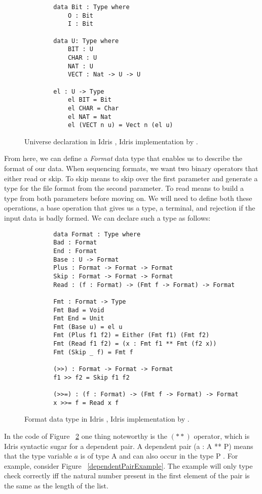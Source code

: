 \begin{figure}
    \caption{Universe declaration in Idris \cite{power_of_pi}, Idris implementation by \cite{idris_pop}.}
    \label{universe}
    \begin{lstlisting}
        data Bit : Type where
            O : Bit
            I : Bit

        data U: Type where
            BIT : U
            CHAR : U
            NAT : U
            VECT : Nat -> U -> U
        
        el : U -> Type
            el BIT = Bit
            el CHAR = Char
            el NAT = Nat
            el (VECT n u) = Vect n (el u) 
    \end{lstlisting}
\end{figure}

From here, we can define a \textit{Format} data type that enables us to describe
the format of our data. When sequencing formats, we want two binary operators
that either read or skip. To skip means to skip over the first parameter and
generate a type for the file format from the second parameter. To read means to
build a type from both parameters before moving on. We will need to define both
these operations, a base operation that gives us a type, a terminal, and
rejection if the input data is badly formed. We can declare such a type as
follows: 

\begin{figure}
    \caption{Format data type in Idris \cite{power_of_pi}, Idris implementation by \cite{idris_pop}.}
    \label{formatDeclaration}
    \begin{lstlisting}
        data Format : Type where
        Bad : Format
        End : Format
        Base : U -> Format
        Plus : Format -> Format -> Format
        Skip : Format -> Format -> Format
        Read : (f : Format) -> (Fmt f -> Format) -> Format

        Fmt : Format -> Type
        Fmt Bad = Void
        Fmt End = Unit
        Fmt (Base u) = el u
        Fmt (Plus f1 f2) = Either (Fmt f1) (Fmt f2)
        Fmt (Read f1 f2) = (x : Fmt f1 ** Fmt (f2 x))
        Fmt (Skip _ f) = Fmt f

        (>>) : Format -> Format -> Format
        f1 >> f2 = Skip f1 f2

        (>>=) : (f : Format) -> (Fmt f -> Format) -> Format
        x >>= f = Read x f
    \end{lstlisting}
\end{figure}

In the code of Figure ~\ref{formatDeclaration} one thing noteworthy is the
$(**)$ operator, which is Idris syntactic sugar for a dependent pair. A
dependent pair (a : A ** P) means that the type variable $a$ is of type A and can
also occur in the type P \cite{idris_dependent_pairs}. For example, consider Figure
~\ref{dependentPairExample}. The example will only type check correctly iff the
natural number present in the first element of the pair is the same as the
length of the list. 


